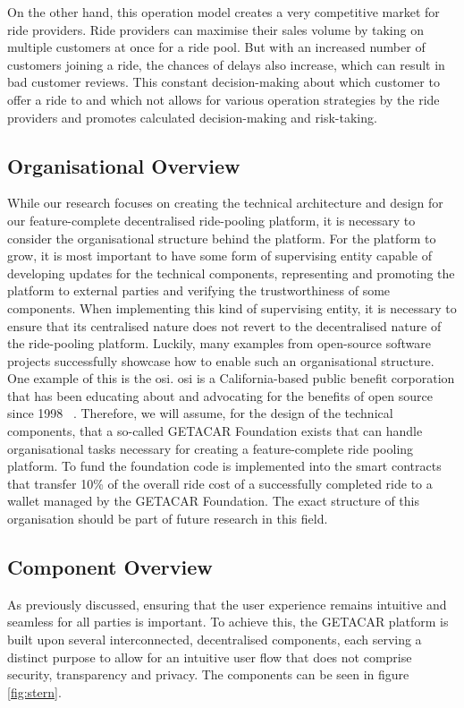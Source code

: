 On the other hand, this operation model creates a very competitive market for ride providers. Ride providers can maximise their sales volume by taking on multiple customers at once for a ride pool. But with an increased number of customers joining a ride, the chances of delays also increase, which can result in bad customer reviews. This constant decision-making about which customer to offer a ride to and which not allows for various operation strategies by the ride providers and promotes calculated decision-making and risk-taking. 

\subsection{Organisational Overview}\label{subsec:OrganisationalOverview}
While our research focuses on creating the technical architecture and design for our feature-complete decentralised ride-pooling platform, it is necessary to consider the organisational structure behind the platform. For the platform to grow, it is most important to have some form of supervising entity capable of developing updates for the technical components, representing and promoting the platform to external parties and verifying the trustworthiness of some components. When implementing this kind of supervising entity, it is necessary to ensure that its centralised nature does not revert to the decentralised nature of the ride-pooling platform. Luckily, many examples from open-source software projects successfully showcase how to enable such an organisational structure. One example of  this is the \gls{osi}. \gls{osi} is a California-based public benefit corporation that has been educating about and advocating for the benefits of open source since 1998 ~\cite{OSI.}. Therefore, we will assume, for the design of the technical components, that a so-called GETACAR Foundation exists that can handle organisational tasks necessary for creating a feature-complete ride pooling platform. To fund the foundation code is implemented into the smart contracts that transfer 10\% of the overall ride cost of a successfully completed ride to a wallet managed by the GETACAR Foundation. The exact structure of this organisation should be part of future research in this field.

\subsection{Component Overview}\label{subsec:ComponentOverview}
As previously discussed, ensuring that the user experience remains intuitive and seamless for all parties is important. To achieve this, the GETACAR platform is built upon several interconnected, decentralised components, each serving a distinct purpose to allow for an intuitive user flow that does not comprise security, transparency and privacy. The components can be seen in figure \ref{fig:stern}.

